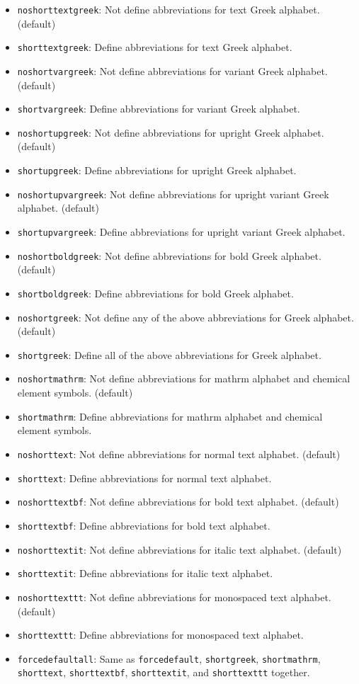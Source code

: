 \documentclass[a4paper,12pt]{article}
\begin{document}
\begin{itemize}
\item \verb|noshorttextgreek|: Not define abbreviations for text Greek alphabet. (default)
\item \verb|shorttextgreek|: Define abbreviations for text Greek alphabet.
\item \verb|noshortvargreek|: Not define abbreviations for variant Greek alphabet. (default)
\item \verb|shortvargreek|: Define abbreviations for variant Greek alphabet.
\item \verb|noshortupgreek|: Not define abbreviations for upright Greek alphabet. (default)
\item \verb|shortupgreek|: Define abbreviations for upright Greek alphabet.
\item \verb|noshortupvargreek|: Not define abbreviations for upright variant Greek alphabet. (default)
\item \verb|shortupvargreek|: Define abbreviations for upright variant Greek alphabet.
\item \verb|noshortboldgreek|: Not define abbreviations for bold Greek alphabet. (default)
\item \verb|shortboldgreek|: Define abbreviations for bold Greek alphabet.
\item \verb|noshortgreek|: Not define any of the above abbreviations for Greek alphabet. (default)
\item \verb|shortgreek|: Define all of the above abbreviations for Greek alphabet.
\item \verb|noshortmathrm|: Not define abbreviations for mathrm alphabet and chemical element symbols. (default)
\item \verb|shortmathrm|: Define abbreviations for mathrm alphabet and chemical element symbols.
\item \verb|noshorttext|: Not define abbreviations for normal text alphabet. (default)
\item \verb|shorttext|: Define abbreviations for normal text alphabet.
\item \verb|noshorttextbf|: Not define abbreviations for bold text alphabet. (default)
\item \verb|shorttextbf|: Define abbreviations for bold text alphabet.
\item \verb|noshorttextit|: Not define abbreviations for italic text alphabet. (default)
\item \verb|shorttextit|: Define abbreviations for italic text alphabet.
\item \verb|noshorttexttt|: Not define abbreviations for monospaced text alphabet. (default)
\item \verb|shorttexttt|: Define abbreviations for monospaced text alphabet.
\item \verb|forcedefaultall|: Same as \verb|forcedefault|, \verb|shortgreek|, \verb|shortmathrm|, \verb|shorttext|, \verb|shorttextbf|, \verb|shorttextit|, and \verb|shorttexttt| together.
\end{itemize}
\end{document}

